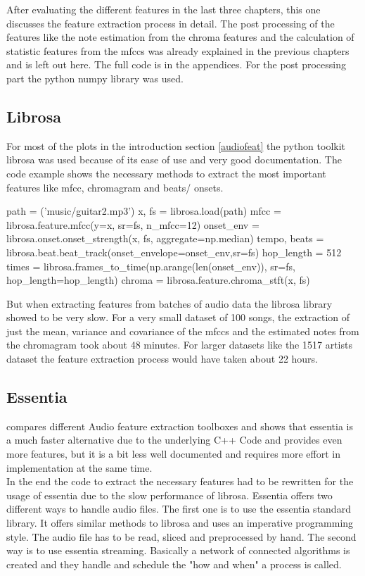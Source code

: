 After evaluating the different features in the last three chapters, this one discusses the feature extraction process in detail. The post processing of the features like the note estimation from the chroma features and the calculation of statistic features from the mfccs was already explained in the previous chapters and is left out here. The full code is in the appendices. For the post processing part the python numpy library was used.  

\subsection{Librosa}

For most of the plots in the introduction section \ref{audiofeat} the python toolkit librosa was used because of its ease of use and very good documentation. The code example shows the necessary methods to extract the most important features like mfcc, chromagram and beats/ onsets.
\begin{pythonCode}
path = ('music/guitar2.mp3')
x, fs = librosa.load(path)
mfcc = librosa.feature.mfcc(y=x, sr=fs, n_mfcc=12)
onset_env = librosa.onset.onset_strength(x, fs, aggregate=np.median)
tempo, beats = librosa.beat.beat_track(onset_envelope=onset_env,sr=fs)
hop_length = 512
times = librosa.frames_to_time(np.arange(len(onset_env)), sr=fs, hop_length=hop_length)
chroma = librosa.feature.chroma_stft(x, fs)
\end{pythonCode}	
But when extracting features from batches of audio data the librosa library showed to be very slow. For a very small dataset of 100 songs, the extraction of just the mean, variance and covariance of the mfccs and the estimated notes from the chromagram took about 48 minutes. 
For larger datasets like the 1517 artists dataset the feature extraction process would have taken about 22 hours. 

\subsection{Essentia}

\cite{audiofeattoolb} compares different Audio feature extraction toolboxes and shows that essentia is a much faster alternative due to the underlying C++ Code and provides even more features, but it is a bit less well documented and requires more effort in implementation at the same time.\\ 
In the end the code to extract the necessary features had to be rewritten for the usage of essentia due to the slow performance of librosa. Essentia offers two different ways to handle audio files. The first one is to use the essentia standard library. It offers similar methods to librosa and uses an imperative programming style. The audio file has to be read, sliced and preprocessed by hand. 
The second way is to use essentia streaming. Basically a network of connected algorithms is created and they handle and schedule the "how and when" a process is called.

